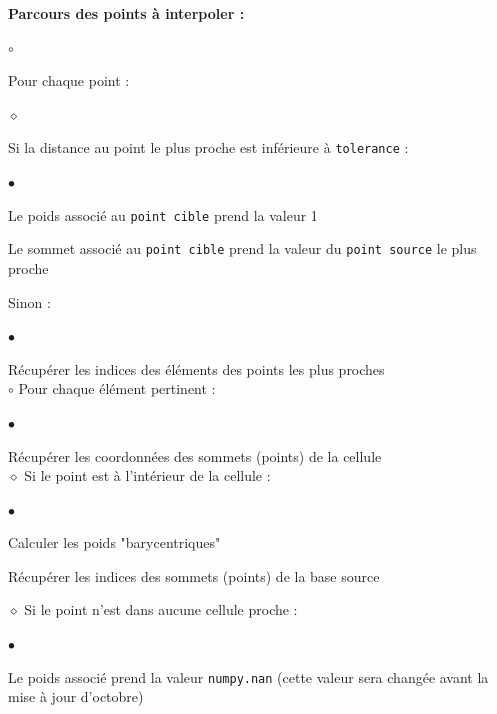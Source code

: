 \textbf{Parcours des points à interpoler :}
\begin{list}{$\circ$}{\leftmargin=0.5cm  \itemsep=0cm}
    \item Pour chaque point :
    \begin{list}{$\diamond$}{\leftmargin=0.5cm  \itemsep=0cm}
        \item Si la distance au point le plus proche est inférieure à \texttt{tolerance} :
        \begin{list}{$\bullet$}{\leftmargin=0.5cm \itemsep=0cm}
            \item Le poids associé au \texttt{point cible} prend la valeur 1
            \item Le sommet associé au \texttt{point cible} prend la valeur du \texttt{point source} le plus proche
        \end{list}
        \item Sinon :
        \begin{list}{$\bullet$}{\leftmargin=0.5cm  \itemsep=0cm}
            \item Récupérer les indices des éléments des points les plus proches\\
            $\circ$ Pour chaque élément pertinent :
            \begin{list}{$\bullet$}{\leftmargin=0.5cm \itemsep=0cm}
                \item Récupérer les coordonnées des sommets (points) de la cellule\\
                $\diamond$ Si le point est à l'intérieur de la cellule :
                \begin{list}{$\bullet$}{\leftmargin=0.5cm  \itemsep=0cm}
                    \item Calculer les poids "barycentriques"
                    \item Récupérer les indices des sommets (points) de la base source
                \end{list}
            \end{list}
        \end{list}
    \end{list}
    $\diamond$ Si le point n'est dans aucune cellule proche :
    \begin{list}{$\bullet$}{\leftmargin=0.5cm  \itemsep=0cm}
        \item Le poids associé prend la valeur \texttt{numpy.nan} (cette valeur sera changée avant la mise à jour d'octobre)
    \end{list}
\end{list}

